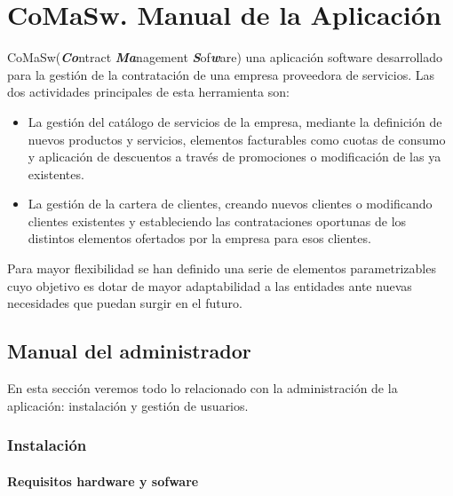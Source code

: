 \chapter{CoMaSw. Manual de la Aplicación}
\label{chap:manual}

\lettrine{CoMaSw} (\emph{\textbf{Co}}ntract \emph{\textbf{Ma}}nagement \emph{\textbf{S}}of\emph{\textbf{w}}are) una aplicación software desarrollado para la gestión de la contratación de una empresa proveedora de servicios. Las dos actividades principales de esta herramienta son:
\begin{itemize}
\item La gestión del catálogo de servicios de la empresa, mediante la definición de nuevos productos y servicios, elementos facturables como cuotas de consumo y aplicación de descuentos a través de promociones o modificación de las ya existentes.
\item La gestión de la cartera de clientes, creando nuevos clientes o modificando clientes existentes y estableciendo las contrataciones oportunas de los distintos elementos ofertados por la empresa para esos clientes.
\end{itemize}

Para mayor flexibilidad se han definido una serie de elementos parametrizables cuyo objetivo es dotar de mayor adaptabilidad a las entidades ante nuevas necesidades que puedan surgir en el futuro.




\section{Manual del administrador}
\label{sec:manual-administrador}

En esta sección veremos todo lo relacionado con la administración de la aplicación: instalación y gestión de usuarios.

\subsection{Instalación}
\label{sub:instalacion}

\subsubsection{Requisitos hardware y sofware}
\label{sub:requisitos}

